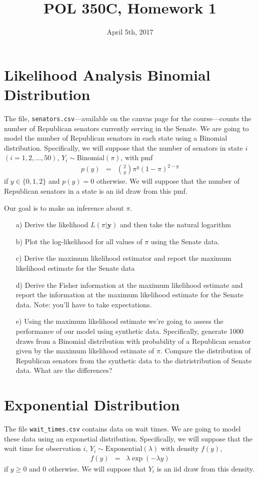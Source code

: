 \documentclass[letterpaper,12pt]{article}
\title{POL 350C, Homework 1}
\date{April 5th, 2017}
\numberwithin{equation}{section}
\numberwithin{equation}{section}
\begin{document}
\maketitle

\section{Likelihood Analysis Binomial Distribution}
The file, {\tt senators.csv}---available on the canvas page for the course---counts the number of Republican senators currently serving in the Senate.  We are going to model the number of Republican senators in each state using a Binomial distribution.  Specifically, we will suppose that the number of senators in state $i$ $(i =1, 2, \hdots, 50)$, $Y_{i} \sim \text{Binomial}(\pi)$, with pmf 
\begin{eqnarray}
p(y) & = & {{2}\choose{y}} \pi^{y} (1- \pi)^{2 - y} \nonumber 
\end{eqnarray}
if $y \in \{0, 1, 2\}$ and $p(y) = 0$ otherwise.  We will suppose that the number of Republican senators in a state is an iid draw from this pmf.  

Our goal is to make an inference about $\pi$.  

\begin{itemize}
\item[a)] Derive the likelihood $L(\pi | \boldsymbol{y})$ and then take the natural logarithm
\item[b)] Plot the log-likelihood for all values of $\pi$ using the Senate data.  
\item[c)] Derive the maximum likelihood estimator and report the maximum likelihood estimate for the Senate data
\item[d)] Derive the Fisher information at the maximum likelihood estimate and report the information at the maximum likelihood estimate for the Senate data.  Note: you'll have to take expectations.  
\item[e)] Using the maximum likelihood estimate we're going to assess the performance of our model using synthetic data.  Specifically, generate 1000 draws from a Binomial distribution with probability of a Republican senator given by the maximum likelihood estimate of $\pi$.  Compare the distribution of Republican senators from the synthetic data to the distristribution of Senate data.  What are the differences?  
\end{itemize}


\section{Exponential Distribution}
The file {\tt wait\_times.csv} contains data on wait times.  We are going to model these data using an exponetial distribution.  Specifically, we will suppose that the wait time for observation $i$, $Y_{i} \sim \text{Exponential}(\lambda)$ with density $f(y)$, 
\begin{eqnarray}
f(y) & = & \lambda \exp ( - \lambda y ) \nonumber 
\end{eqnarray}
if $y\geq 0$ and $0$ otherwise.  We will suppose that $Y_{i}$ is an iid draw from this density.  
\end{document}
